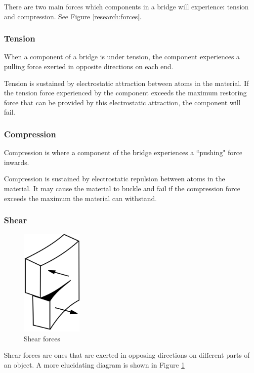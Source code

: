 \documentclass[a4paper,11pt]{article}
\begin{document}
There are two main forces which components in a bridge will experience:
tension and compression. See Figure \ref{research:forces}.


\subsubsection{Tension}

When a component of a bridge is under tension, the component experiences a
pulling force exerted in opposite directions on each end.

Tension is sustained by electrostatic attraction between atoms in the material.
If the tension force experienced by the component exceeds the maximum restoring
force that can be provided by this electrostatic attraction, the component will
fail.


\subsubsection{Compression}

Compression is where a component of the bridge experiences a ``pushing" force
inwards.

Compression is sustained by electrostatic repulsion between atoms in the
material.
It may cause the material to buckle and fail if the compression force exceeds
the maximum the material can withstand.


\subsubsection{Shear}

\begin{figure}
\begin{center}
\includegraphics[width=3cm]{figures/shear.png}
\end{center}
\caption{Shear forces}
\label{research:shear}
\end{figure}

Shear forces are ones that are exerted in opposing directions on different parts
of an object.
A more elucidating diagram is shown in Figure \ref{research:shear}
\end{document}
